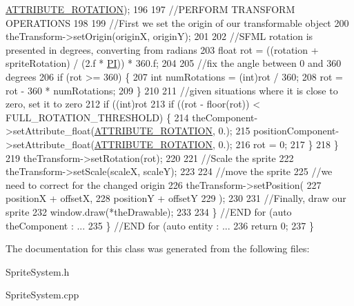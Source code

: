 \begin{DoxyCode}
      \hyperlink{_a_e___attributes_8h_a70254d936ce8b3662e1a7472c36832d5}{ATTRIBUTE\_ROTATION});
196 
197             \textcolor{comment}{//PERFORM TRANSFORM OPERATIONS}
198 
199             \textcolor{comment}{//First we set the origin of our transformable object}
200             theTransform->setOrigin(originX, originY);
201 
202             \textcolor{comment}{//SFML rotation is presented in degrees, converting from radians}
203             \textcolor{keywordtype}{float} rot = ((rotation + spriteRotation) / (2.f * \hyperlink{_a_e___utilities_8h_a598a3330b3c21701223ee0ca14316eca}{PI})) * 360.f;
204 
205             \textcolor{comment}{//fix the angle between 0 and 360 degrees}
206             \textcolor{keywordflow}{if} (rot >= 360) \{
207                 \textcolor{keywordtype}{int} numRotations = (int)rot / 360;
208                 rot = rot - 360 * numRotations;
209             \}
210 
211             \textcolor{comment}{//given situations where it is close to zero, set it to zero}
212             \textcolor{keywordflow}{if} ((\textcolor{keywordtype}{int})rot %
213                 \textcolor{keywordflow}{if} ((rot - floor(rot)) < FULL\_ROTATION\_THRESHOLD) \{
214                     theComponent->setAttribute\_float(\hyperlink{_a_e___attributes_8h_a70254d936ce8b3662e1a7472c36832d5}{ATTRIBUTE\_ROTATION}, 0.);
215                     positionComponent->setAttribute\_float(\hyperlink{_a_e___attributes_8h_a70254d936ce8b3662e1a7472c36832d5}{ATTRIBUTE\_ROTATION}, 0.);
216                     rot = 0;
217                 \}
218             \}
219             theTransform->setRotation(rot);
220 
221             \textcolor{comment}{//Scale the sprite}
222             theTransform->setScale(scaleX, scaleY);
223 
224             \textcolor{comment}{//move the sprite}
225             \textcolor{comment}{//we need to correct for the changed origin}
226             theTransform->setPosition(
227                 positionX + offsetX, 
228                 positionY + offsetY
229                 );
230 
231             \textcolor{comment}{//Finally, draw our sprite}
232             window.draw(*theDrawable);
233 
234         \} \textcolor{comment}{//END for (auto theComponent : ...}
235     \} \textcolor{comment}{//END for (auto entity : ...}
236     \textcolor{keywordflow}{return} 0;
237 \}\end{DoxyCode}


The documentation for this class was generated from the following files\-:\begin{DoxyCompactItemize}
\item 
Sprite\-System.\-h\item 
Sprite\-System.\-cpp\end{DoxyCompactItemize}
